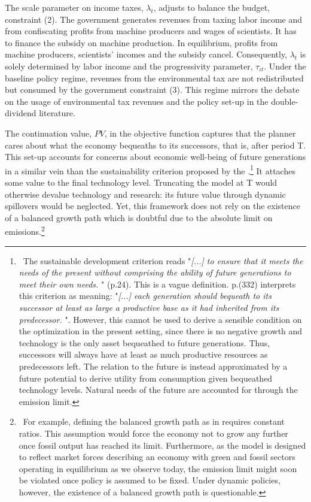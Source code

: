 The scale parameter on income taxes, $\lambda_t$, adjusts to balance the budget, constraint (2).
The government generates revenues from taxing labor income and from confiscating profits from machine producers and wages of scientists. It has to finance the subsidy on machine production. In equilibrium, profits from machine producers, scientists' incomes and the subsidy cancel. Consequently, $\lambda_t$ is solely determined by labor income and the progressivity parameter, $\tau_{\iota t}$.
Under the baseline policy regime, revenues from the environmental tax are not redistributed but consumed by the government  constraint (3). This regime mirrors the debate on the usage of environmental tax revenues and the policy set-up in the double-dividend literature. 

The continuation value, $PV$, in the objective function captures that the planner cares about what the economy bequeaths to its successors, that is, after period T. 
This set-up accounts for concerns about economic well-being of future generations in a similar vein than the sustainability criterion proposed by the \cite{UNSUS}.\footnote{\ The sustainable development criterion reads "\textit{[...] to ensure that it meets the needs of the present without comprising the ability of future generations to meet their own needs.
	}" (p.24). This is a vague definition.  \cite{Dasgupta2021} p.(332) interprets this criterion as meaning: 
	"\textit{[...] each generation should bequeath to its successor at least as large a productive base as it had inherited from its predecessor. }". 
	However, this cannot be used to derive a sensible condition on the optimization in the present setting, since there is no negative growth and technology is the only asset bequeathed to future generations. Thus,
	successors will always have at least as much productive resources as predecessors left. The relation to the future is instead approximated by a future potential to derive utility from consumption given bequeathed technology levels. Natural needs of the future are accounted for through the emission limit. } It attaches some value to the final technology level. Truncating the model at T would otherwise devalue technology and research: its future value through dynamic spillovers would be neglected.
 Yet, this framework does not rely on the existence of a balanced growth path which is doubtful due to the absolute limit on emissions.\footnote{\  For example, defining the balanced growth path as in \cite{Fried2018ClimateAnalysis} requires constant ratios. This assumption would force the economy not to grow any further once fossil output has reached its limit. Furthermore, as the model is designed to reflect market forces describing an economy with green and fossil sectors operating in equilibrium as we observe today, the emission limit might soon be violated once policy is assumed to be fixed. Under dynamic policies, however, the existence of a balanced growth path is questionable.}


